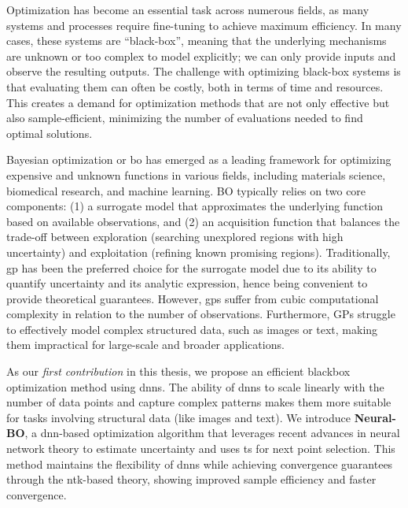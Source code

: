 \thispagestyle{plain}
\label{chap:abstract}
Optimization has become an essential task across numerous fields, as many systems and processes require fine-tuning to achieve maximum efficiency. In many cases, these systems are ``black-box'', meaning that the underlying mechanisms are unknown or too complex to model explicitly; we can only provide inputs and observe the resulting outputs. The challenge with optimizing black-box systems is that evaluating them can often be costly, both in terms of time and resources. This creates a demand for optimization methods that are not only effective but also sample-efficient, minimizing the number of evaluations needed to find optimal solutions. 


Bayesian optimization or \ac{bo} has emerged as a leading framework for optimizing expensive and unknown functions in various fields, including materials science, biomedical research, and machine learning. BO typically relies on two core components: (1) a surrogate model that approximates the underlying function based on available observations, and (2) an acquisition function that balances the trade-off between exploration (searching unexplored regions with high uncertainty) and exploitation (refining known promising regions). Traditionally, \ac{gp} has been the preferred choice for the surrogate model due to its ability to quantify uncertainty and its analytic expression, hence being convenient to provide theoretical guarantees. However, \acp{gp} suffer from cubic computational complexity in relation to the number of observations. Furthermore, GPs struggle to effectively model complex structured data, such as images or text,  making them impractical for large-scale and broader applications.


As our \emph{first contribution} in this thesis, we propose an efficient blackbox optimization method using \acp{dnn}. The ability of \acp{dnn} to scale linearly with the number of data points and capture complex patterns makes them more suitable for tasks involving structural data (like images and text). We introduce \textbf{Neural-BO}, a \ac{dnn}-based optimization algorithm that leverages recent advances in neural network theory to estimate uncertainty and uses \ac{ts} for next point selection. This method maintains the flexibility of \acp{dnn} while achieving convergence guarantees through the \ac{ntk}-based theory, showing improved sample efficiency and faster convergence.   

